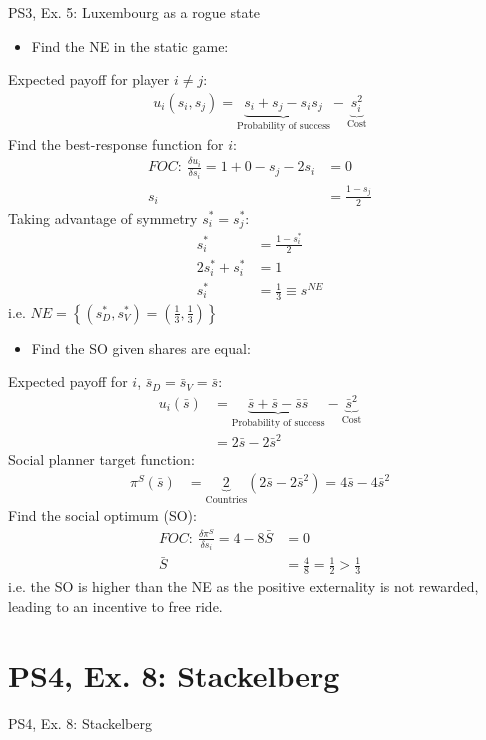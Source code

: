 \begin{frame}{PS3, Ex. 5: Luxembourg as a rogue state}
  \begin{multicols}{2}
    \begin{itemize}
      \item[(a)] Find the NE in the static game:
    \end{itemize}
    Expected payoff for player $i\neq j$:
    \begin{align*}
      u_i(s_i,s_j)=\underbrace{s_i+s_j-s_is_j}_\text{Probability of success}-\underbrace{s_i^2}_\text{Cost}
    \end{align*}
    Find the best-response function for $i$:
    \begin{align*}
      FOC:\ \frac{\delta u_i}{\delta s_i}=1+0-s_j-2s_i&=0\\
       s_i&=\frac{1-s_j}{2}
    \end{align*}
    Taking advantage of symmetry $s_i^{*}=s_j^{*}$:
    \begin{align*}
       s_i^{*}&=\frac{1-s_i^{*}}{2}\\
      2s_i^{*}+s_i^{*}&=1\\
       s_i^{*}&=\frac{1}{3}\equiv s^{NE}
    \end{align*}
    i.e. $NE=\left\{(s_D^{*},s_V^{*})=(\frac{1}{3},\frac{1}{3})\right\}$
  \vfill\null\columnbreak
    \begin{itemize}
      \item[(b)] Find the SO given shares are equal:
    \end{itemize}
    Expected payoff for $i$, $\bar{s}_D=\bar{s}_V=\bar{s}$:
    \begin{align*}
      u_i(\bar{s})&=\underbrace{\bar{s}+\bar{s}-\bar{s}\bar{s}}_\text{Probability of success}-\underbrace{\bar{s}^2}_\text{Cost}\\
                  &=2\bar{s}-2\bar{s}^2
    \end{align*}
    Social planner target function:
    \begin{align*}
      \pi^S(\bar{s})&=\underbrace{2}_\text{Countries}(2\bar{s}-2\bar{s}^2)=4\bar{s}-4\bar{s}^2
    \end{align*}
    Find the social optimum (SO):
    \begin{align*}
      FOC:\ \frac{\delta\pi^S}{\delta s_i}=4-8\bar{S}&=0\\
       \bar{S}&=\frac{4}{8}=\frac{1}{2}>\frac{1}{3}
    \end{align*}
    i.e. the SO is higher than the NE as the positive externality is not rewarded, leading to an incentive to free ride.
  \vfill\null
  \end{multicols}
\end{frame}


\section{PS4, Ex. 8: Stackelberg}

\begin{frame}{PS4, Ex. 8: Stackelberg}

\end{frame}





